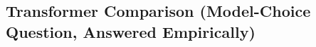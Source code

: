 \subsection{Transformer Comparison (Model-Choice Question, Answered Empirically)}
\label{sec:transformer-comparison}
%
%
%
%
